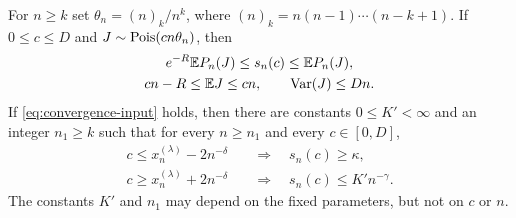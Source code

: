\begin{samepage}
\begin{lemma}\label{lem:proper-transfer}
For \(n\ge k\) set \(\theta_n=(n)_k/n^k\), where
\((n)_k=n(n-1)\cdots(n-k+1)\).  If \(0\le c\le D\) and
\(J\sim\operatorname{Pois}(cn\theta_n)\), then
\begin{equation}\label{eq:proper-sandwich}
\begin{gathered}
 e^{-R}\mathbb E P_n(J)\le s_n(c)\le\mathbb E P_n(J),\\
 cn-R\le\mathbb E J\le cn,\qquad \operatorname{Var}(J)\le Dn.
\end{gathered}
\end{equation}
If \eqref{eq:convergence-input} holds, then there are constants
\(0\le K'<\infty\) and an integer \(n_1\ge k\) such that for every \(n\ge n_1\) and
every \(c\in[0,D]\),
\begin{align}
 c\le x_n^{(\lambda)}-2n^{-\delta}
 &\quad\Longrightarrow\quad s_n(c)\ge\kappa,
 \label{eq:proper-transfer-low}\\
 c\ge x_n^{(\lambda)}+2n^{-\delta}
 &\quad\Longrightarrow\quad s_n(c)\le K'n^{-\gamma}.
 \label{eq:proper-transfer-high}
\end{align}
The constants \(K'\) and \(n_1\) may depend on the fixed parameters,
but not on \(c\) or \(n\).
\end{lemma}
\end{samepage}

